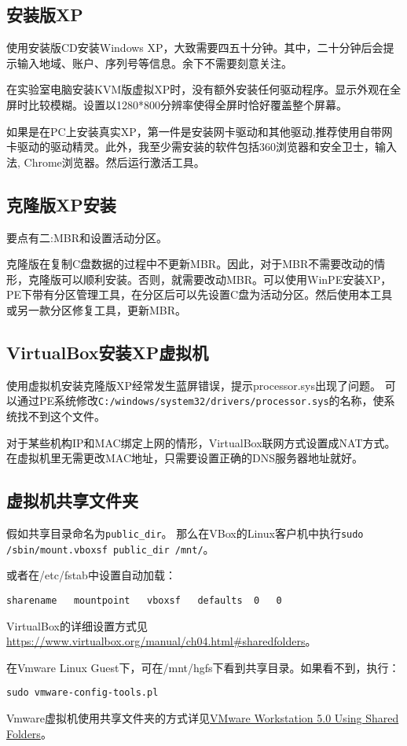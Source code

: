 \subsection{安装版XP}
使用安装版CD安装Windows XP，大致需要四五十分钟。其中，二十分钟后会提示输入地域、账户、序列号等信息。余下不需要刻意关注。

在实验室电脑安装KVM版虚拟XP时，没有额外安装任何驱动程序。显示外观在全屏时比较模糊。设置以1280*800分辨率使得全屏时恰好覆盖整个屏幕。

如果是在PC上安装真实XP，第一件是安装网卡驱动和其他驱动,推荐使用自带网卡驱动的驱动精灵。此外，我至少需安装的软件包括360浏览器和安全卫士，输入法, Chrome浏览器。然后运行激活工具。

\subsection{克隆版XP安装}
要点有二:MBR和设置活动分区。

克隆版在复制C盘数据的过程中不更新MBR。因此，对于MBR不需要改动的情形，克隆版可以顺利安装。否则，就需要改动MBR。可以使用WinPE安装XP，PE下带有分区管理工具，在分区后可以先设置C盘为活动分区。然后使用本工具或另一款分区修复工具，更新MBR。



\subsection{VirtualBox安装XP虚拟机}
使用虚拟机安装克隆版XP经常发生蓝屏错误，提示processor.sys出现了问题。
可以通过PE系统修改\verb+C:/windows/system32/drivers/processor.sys+的名称，使系统找不到这个文件。

对于某些机构IP和MAC绑定上网的情形，VirtualBox联网方式设置成NAT方式。
在虚拟机里无需更改MAC地址，只需要设置正确的DNS服务器地址就好。

\subsection{虚拟机共享文件夹}
假如共享目录命名为\verb$public_dir$。
那么在VBox的Linux客户机中执行\verb$sudo /sbin/mount.vboxsf public_dir /mnt/$。

或者在/etc/fstab中设置自动加载：
\begin{verbatim}
sharename   mountpoint   vboxsf   defaults  0   0
\end{verbatim}
VirtualBox的详细设置方式见\url{https://www.virtualbox.org/manual/ch04.html#sharedfolders}。

在Vmware Linux Guest下，可在/mnt/hgfs下看到共享目录。如果看不到，执行：

\begin{verbatim}
sudo vmware-config-tools.pl
\end{verbatim}

Vmware虚拟机使用共享文件夹的方式详见\href{https://www.vmware.com/support/ws5/doc/ws_running_shared_folders.html}{VMware
Workstation 5.0 Using Shared Folders}。












